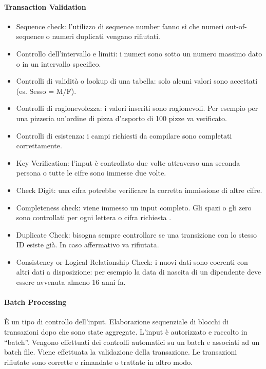 \paragraph{Transaction Validation}
\begin{itemize}
	\item Sequence check: l'utilizzo di sequence number fanno sì che numeri
	out-of-sequence o numeri duplicati vengano rifiutati.
	\item Controllo dell'intervallo e limiti: i numeri sono sotto un numero
	massimo dato o in un intervallo specifico.
	\item Controlli di validità o lookup di una tabella:
	solo alcuni valori sono accettati (es. Sesso = M/F).
	\item Controlli di ragionevolezza: i valori inseriti sono ragionevoli.
	Per esempio per una pizzeria un'ordine di pizza d'asporto di 100 pizze
	va verificato.
	\item Controlli di esistenza: i campi richiesti da compilare
	sono completati correttamente.
	\item Key Verification: l'input è controllato due volte attraverso
	una seconda persona o tutte le cifre sono immesse due volte.
	\item Check Digit: una cifra potrebbe verificare la corretta
	immissione di altre cifre.
	\item Completeness check: viene immesso un input completo. Gli
	spazi o gli zero sono controllati per ogni lettera o cifra 
	richiesta .
	\item Duplicate Check: bisogna sempre controllare se una transizione
	con lo stesso ID esiste già. In caso affermativo va rifiutata.
	\item Consistency or Logical Relationship Check: i nuovi dati
	sono coerenti con altri dati a disposizione: per esempio
	la data di nascita di un dipendente deve essere avvenuta almeno
	16 anni fa.
\end{itemize}


\paragraph{Batch Processing} 
È un tipo di controllo dell'input.
Elaborazione sequenziale di blocchi di transazioni
dopo che sono state aggregate. 
L'input è autorizzato e raccolto in ``batch''. Vengono effettuati
dei controlli automatici su un batch e associati ad un batch file.
Viene effettuata la validazione della transazione. Le transazioni
rifiutate sono corrette e rimandate o trattate in altro modo.

